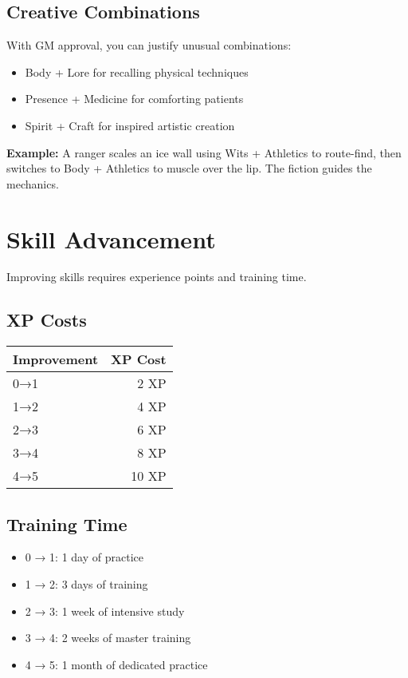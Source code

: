 \documentclass[11pt,twoside,openany]{book}
\begin{document}
\subsection*{Creative Combinations}

With GM approval, you can justify unusual combinations:
\begin{itemize}
\item Body + Lore for recalling physical techniques
\item Presence + Medicine for comforting patients
\item Spirit + Craft for inspired artistic creation
\end{itemize}

\textbf{Example:} A ranger scales an ice wall using Wits + Athletics to route-find, then switches to Body + Athletics to muscle over the lip. The fiction guides the mechanics.

\section*{Skill Advancement} 

Improving skills requires experience points and training time.

\subsection*{XP Costs}

\begin{center}
\begin{tabular}{|l|r|}
\hline
\textbf{Improvement} & \textbf{XP Cost} \\
\hline
0→1 & 2 XP \\
1→2 & 4 XP \\
2→3 & 6 XP \\
3→4 & 8 XP \\
4→5 & 10 XP \\
\hline
\end{tabular}
\end{center}

\subsection*{Training Time}

\begin{itemize}
\item 0 → 1: 1 day of practice
\item 1 → 2: 3 days of training
\item 2 → 3: 1 week of intensive study
\item 3 → 4: 2 weeks of master training
\item 4 → 5: 1 month of dedicated practice
\end{itemize}
\end{document}
